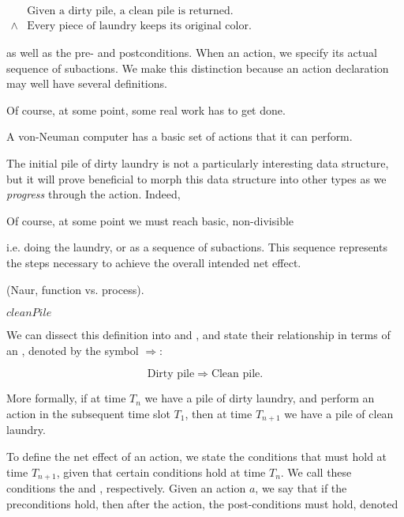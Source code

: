 \begin{codebox}
\zi
$\begin{array}{ll}
&\text{Given a dirty pile, a clean pile is returned.}\\
\wedge&\text{Every piece of laundry keeps its original color.}
\end{array}$
\end{codebox}



as well as the pre- and postconditions. When 
an action, we specify its actual sequence of subactions. We make this
distinction because an action declaration may well have several definitions.

Of course, at some point, some real work has to get done.

A von-Neuman computer has a basic set of actions that it can perform.


The initial pile of dirty laundry is not a particularly interesting data
structure, but it will prove beneficial to morph this data structure into other
types as we \emph{progress} through the action. Indeed, 

Of course, at some point we must reach basic, non-divisible 


 i.e.  doing
the laundry, or as a sequence of subactions. This sequence represents the steps
necessary to achieve the overall intended net effect.


(Naur,
function vs. process).

\begin{codebox}
\li \Return $cleanPile$
\end{codebox}

We can dissect this definition into
 and , and state their relationship in
terms of an , denoted by the symbol $\Rightarrow$:

\begin{equation}
\text{Dirty pile}\Rightarrow \text{Clean pile}.
\end{equation}



More formally, if at time $T_n$ we
have a pile of dirty laundry, and perform an action in the subsequent time slot
$T_1$, then at time $T_{n+1}$ we have a pile of clean laundry.


To define the
net effect of an action, we state the conditions that must hold at time
$T_{n+1}$, given that certain conditions hold at time $T_n$. We call these
conditions the  and , respectively. Given an
action $a$, we say that if the preconditions hold, then after the action, the
post-conditions must hold, denoted

